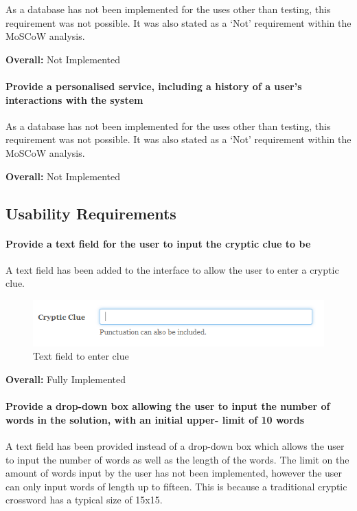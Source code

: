 As a database has not been implemented for the uses other than testing,  this
requirement was not possible. It was also stated as a `Not' requirement  within
the MoSCoW analysis.

{\bf Overall:} Not Implemented


\paragraph{Provide a personalised service, including a history of a user's
interactions with the system}

As a database has not been implemented for the uses other than testing,  this
requirement was not possible. It was also stated as a `Not' requirement  within
the MoSCoW analysis.

{\bf Overall:} Not Implemented


\subsection{Usability Requirements}
\label{sub:test_func_usability}


\paragraph{Provide a text field for the user to input the cryptic clue to be}

A text field has been added to the interface to allow the user to enter a 
cryptic clue. 

\begin{figure}[H]
	\centering
	 \includegraphics[scale=0.8]{evidence/enterclue.png}
	\caption{Text field to enter clue}
\end{figure}

{\bf Overall:} Fully Implemented


\paragraph{Provide a drop-down box allowing the user to input the number of
words in the solution, with an initial upper- limit of 10 words}

A text field has been provided instead of a drop-down box which allows the user
to input the number of words as well as the length of the words. The limit on
the amount of words input by the user has not been implemented, however the
user  can only input words of length up to fifteen. This is because a
traditional cryptic  crossword has a typical size of 15x15.

